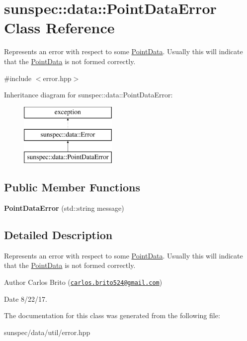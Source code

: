 \hypertarget{classsunspec_1_1data_1_1_point_data_error}{}\section{sunspec\+:\+:data\+:\+:Point\+Data\+Error Class Reference}
\label{classsunspec_1_1data_1_1_point_data_error}


Represents an error with respect to some \hyperlink{structsunspec_1_1data_1_1_point_data}{Point\+Data}. Usually this will indicate that the \hyperlink{structsunspec_1_1data_1_1_point_data}{Point\+Data} is not formed correctly.  




{\ttfamily \#include $<$error.\+hpp$>$}

Inheritance diagram for sunspec\+:\+:data\+:\+:Point\+Data\+Error\+:\begin{figure}[H]
\begin{center}
\leavevmode
\includegraphics[height=3.000000cm]{classsunspec_1_1data_1_1_point_data_error}
\end{center}
\end{figure}
\subsection*{Public Member Functions}
\begin{DoxyCompactItemize}
\item 
\mbox{\label{classsunspec_1_1data_1_1_point_data_error_ac1505937bf3c50890898fbc97381f40c}} 
{\bfseries Point\+Data\+Error} (std\+::string message)
\end{DoxyCompactItemize}


\subsection{Detailed Description}
Represents an error with respect to some \hyperlink{structsunspec_1_1data_1_1_point_data}{Point\+Data}. Usually this will indicate that the \hyperlink{structsunspec_1_1data_1_1_point_data}{Point\+Data} is not formed correctly. 

\begin{DoxyAuthor}{Author}
Carlos Brito (\href{mailto:carlos.brito524@gmail.com}{\tt carlos.\+brito524@gmail.\+com}) 
\end{DoxyAuthor}
\begin{DoxyDate}{Date}
8/22/17. 
\end{DoxyDate}


The documentation for this class was generated from the following file\+:\begin{DoxyCompactItemize}
\item 
sunspec/data/util/error.\+hpp\end{DoxyCompactItemize}
